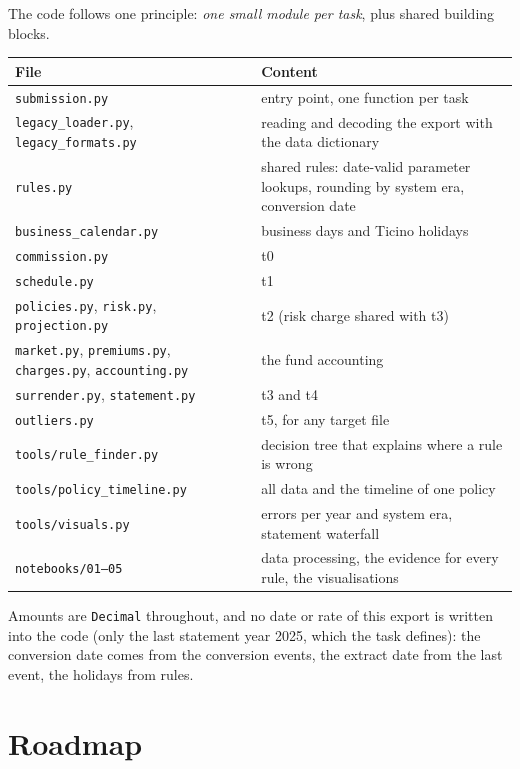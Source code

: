 \documentclass[11pt,a4paper]{article}
\newcommand{\code}[1]{\texttt{#1}}
\begin{document}
The code follows one principle: \emph{one small module per task}, plus shared building blocks.

\begin{center}
\begin{tabularx}{\textwidth}{@{}lL@{}}
\toprule
File & Content \\
\midrule
\code{submission.py} & entry point, one function per task \\
\code{legacy\_loader.py}, \code{legacy\_formats.py} & reading and decoding the export with the data dictionary \\
\code{rules.py} & shared rules: date-valid parameter lookups, rounding by system era, conversion date \\
\code{business\_calendar.py} & business days and Ticino holidays \\
\code{commission.py} & t0 \\
\code{schedule.py} & t1 \\
\code{policies.py}, \code{risk.py}, \code{projection.py} & t2 (risk charge shared with t3) \\
\code{market.py}, \code{premiums.py}, \code{charges.py}, \code{accounting.py} & the fund accounting \\
\code{surrender.py}, \code{statement.py} & t3 and t4 \\
\code{outliers.py} & t5, for any target file \\
\code{tools/rule\_finder.py} & decision tree that explains where a rule is wrong \\
\code{tools/policy\_timeline.py} & all data and the timeline of one policy \\
\code{tools/visuals.py} & errors per year and system era, statement waterfall \\
\code{notebooks/01--05} & data processing, the evidence for every rule, the visualisations \\
\bottomrule
\end{tabularx}
\end{center}

Amounts are \code{Decimal} throughout, and no date or rate of this export is written into the code (only the last statement year
2025, which the task defines): the conversion date comes from the conversion events, the extract date from the
last event, the holidays from rules.

\section{Roadmap}
\end{document}

